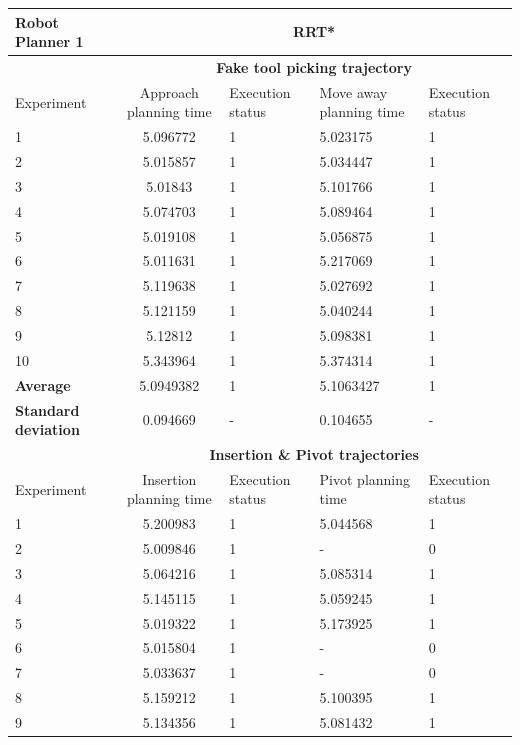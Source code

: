 \begin{longtable}{|p{2cm}|c|p{2cm}|p{2cm}|p{2cm}|}
\hline
Robot Planner 1           & \multicolumn{4}{c}{\textbf{RRT*}}                                                                                                 \vline \\
\hline
                          & \multicolumn{4}{c}{\textbf{Fake tool picking trajectory}}                     \vline \\
\hline
Experiment                & Approach planning time & Execution status & Move away planning time & Execution status  \\
\hline
1	& 5.096772	& 1	& 5.023175	& 1 \\
2	& 5.015857	& 1	& 5.034447	& 1 \\
3	& 5.01843	& 1	& 5.101766	& 1 \\
4	& 5.074703	& 1	& 5.089464	& 1 \\
5	& 5.019108	& 1	& 5.056875	& 1 \\
6	& 5.011631	& 1	& 5.217069	& 1 \\
7	& 5.119638	& 1	& 5.027692	& 1 \\
8	& 5.121159	& 1	& 5.040244	& 1 \\
9	& 5.12812	& 1	& 5.098381	& 1 \\
10	& 5.343964	& 1	& 5.374314	& 1 \\
\hline
\textbf{Average} & 	5.0949382	& 1	& 5.1063427	& 1 \\
\hline
\textbf{Standard deviation} & 	0.094669 &	- &	0.104655 & - \\
\hline
                          & \multicolumn{4}{c}{\textbf{Insertion \& Pivot trajectories}}                     \vline \\
\hline
Experiment                & Insertion planning time & Execution status & Pivot planning time & Execution status  \\
\hline
1 & 5.200983  & 1 &  5.044568 &  1 \\
2 & 5.009846  & 1 &  -  &  0 \\
3 & 5.064216  & 1 &  5.085314 &  1 \\
4 & 5.145115  & 1 &  5.059245 &  1 \\
5 & 5.019322  & 1 &  5.173925 &  1 \\
6 & 5.015804  & 1 &  -  &  0 \\
7 & 5.033637  & 1 &  -  &  0 \\
8 & 5.159212  & 1 &  5.100395 &  1 \\
9 & 5.134356  & 1 &  5.081432 &  1 \\

\end{longtable}
